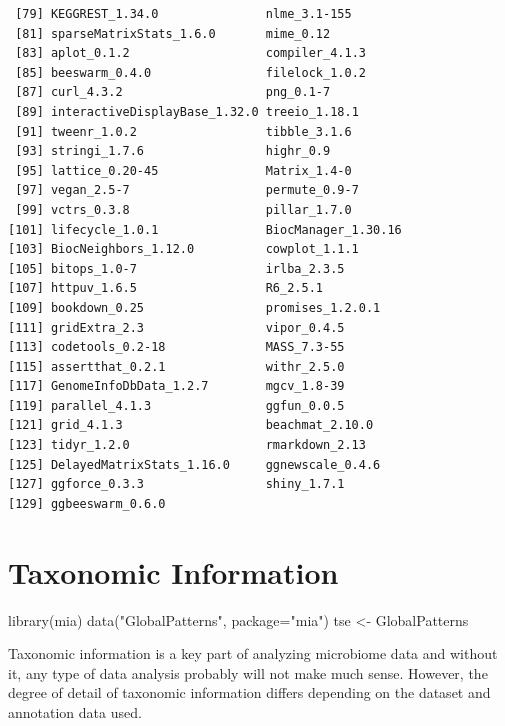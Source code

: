 \documentclass[
]{book}
\newenvironment{Shaded}{\begin{snugshade}}{\end{snugshade}}
\newcommand{\AttributeTok}[1]{\textcolor[rgb]{0.77,0.63,0.00}{#1}}
\newcommand{\FunctionTok}[1]{\textcolor[rgb]{0.00,0.00,0.00}{#1}}
\newcommand{\NormalTok}[1]{#1}
\newcommand{\OtherTok}[1]{\textcolor[rgb]{0.56,0.35,0.01}{#1}}
\newcommand{\StringTok}[1]{\textcolor[rgb]{0.31,0.60,0.02}{#1}}
\begin{document}
\begin{verbatim}
 [79] KEGGREST_1.34.0               nlme_3.1-155                 
 [81] sparseMatrixStats_1.6.0       mime_0.12                    
 [83] aplot_0.1.2                   compiler_4.1.3               
 [85] beeswarm_0.4.0                filelock_1.0.2               
 [87] curl_4.3.2                    png_0.1-7                    
 [89] interactiveDisplayBase_1.32.0 treeio_1.18.1                
 [91] tweenr_1.0.2                  tibble_3.1.6                 
 [93] stringi_1.7.6                 highr_0.9                    
 [95] lattice_0.20-45               Matrix_1.4-0                 
 [97] vegan_2.5-7                   permute_0.9-7                
 [99] vctrs_0.3.8                   pillar_1.7.0                 
[101] lifecycle_1.0.1               BiocManager_1.30.16          
[103] BiocNeighbors_1.12.0          cowplot_1.1.1                
[105] bitops_1.0-7                  irlba_2.3.5                  
[107] httpuv_1.6.5                  R6_2.5.1                     
[109] bookdown_0.25                 promises_1.2.0.1             
[111] gridExtra_2.3                 vipor_0.4.5                  
[113] codetools_0.2-18              MASS_7.3-55                  
[115] assertthat_0.2.1              withr_2.5.0                  
[117] GenomeInfoDbData_1.2.7        mgcv_1.8-39                  
[119] parallel_4.1.3                ggfun_0.0.5                  
[121] grid_4.1.3                    beachmat_2.10.0              
[123] tidyr_1.2.0                   rmarkdown_2.13               
[125] DelayedMatrixStats_1.16.0     ggnewscale_0.4.6             
[127] ggforce_0.3.3                 shiny_1.7.1                  
[129] ggbeeswarm_0.6.0             
\end{verbatim}

\hypertarget{taxonomic-information}{%
\chapter{Taxonomic Information}\label{taxonomic-information}}

\begin{Shaded}
\begin{Highlighting}[]
\FunctionTok{library}\NormalTok{(mia)}
\FunctionTok{data}\NormalTok{(}\StringTok{"GlobalPatterns"}\NormalTok{, }\AttributeTok{package=}\StringTok{"mia"}\NormalTok{)}
\NormalTok{tse }\OtherTok{\textless{}{-}}\NormalTok{ GlobalPatterns }
\end{Highlighting}
\end{Shaded}

Taxonomic information is a key part of analyzing microbiome data and without
it, any type of data analysis probably will not make much sense. However,
the degree of detail of taxonomic information differs depending on the dataset
and annotation data used.
\end{document}
